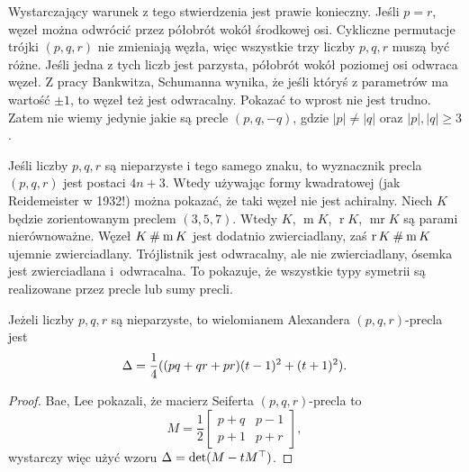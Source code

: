 Wystarczający warunek z tego stwierdzenia jest prawie konieczny.
Jeśli $p = r$, węzeł można odwrócić przez półobrót wokół środkowej osi.
Cykliczne permutacje trójki $(p, q, r)$ nie zmieniają węzła, więc wszystkie trzy liczby $p, q, r$ muszą być różne.
Jeśli jedna z tych liczb jest parzysta, półobrót wokół poziomej osi odwraca węzeł.
Z pracy Bankwitza, Schumanna \cite{bankwitz1934} wynika, że jeśli któryś z parametrów ma wartość $\pm 1$, to węzeł też jest odwracalny.
%
%
Pokazać to wprost nie jest trudno.
Zatem nie wiemy jedynie jakie są precle $(p, q, -q)$, gdzie $|p| \neq |q|$ oraz $|p|, |q| \ge 3$.

Jeśli liczby $p, q, r$ są nieparzyste i tego samego znaku, to wyznacznik precla $(p, q, r)$ jest postaci $4n+3$.
%
Wtedy używając formy kwadratowej (jak Reidemeister w 1932!) można pokazać, że taki węzeł nie jest achiralny.
Niech $K$ będzie zorientowanym preclem $(3, 5, 7)$.
Wtedy $K$, $ \operatorname{m} K$, $\operatorname{r} K$, $ \operatorname{mr} K$ są parami nierównoważne.
Węzeł $K \mathbin{\#}  \operatorname{m} K$ jest dodatnio zwierciadlany, zaś $ \operatorname{r} K \mathbin{\#}  \operatorname{m} K$ ujemnie zwierciadlany.
Trójlistnik jest odwracalny, ale nie zwierciadlany, ósemka jest zwierciadlana i~odwracalna.
To pokazuje, że wszystkie typy symetrii są realizowane przez precle lub sumy precli.

\begin{proposition}
\label{prp:pretzel_alexander}%
%
    Jeżeli liczby $p, q, r$ są nieparzyste, to wielomianem Alexandera $(p, q, r)$-precla jest
    \begin{equation}
        \Delta = \frac 14 ((pq+qr+pr) (t-1)^2 + (t+1)^2).
    \end{equation}
\end{proposition}

\begin{proof}
%
%
    Bae, Lee \cite[lemat 3.1]{bae2020} pokazali, że macierz Seiferta $(p, q, r)$-precla to
    \begin{equation}
        M = \frac 1 2 \begin{bmatrix}
            p+q & p-1 \\
            p+1 & p+r
        \end{bmatrix},
    \end{equation}
    wystarczy więc użyć wzoru $\Delta = \det(M-tM^\top)$.
\end{proof}

